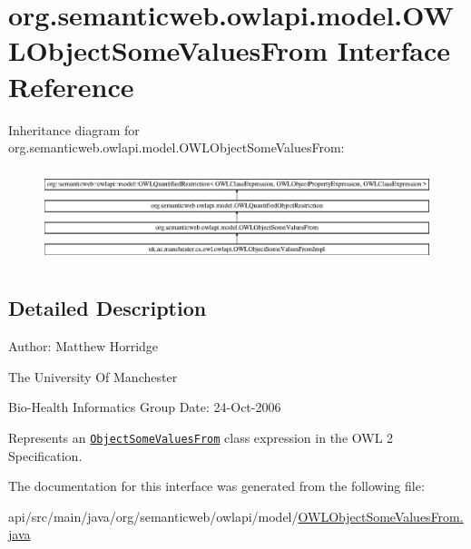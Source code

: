 \hypertarget{interfaceorg_1_1semanticweb_1_1owlapi_1_1model_1_1_o_w_l_object_some_values_from}{\section{org.\-semanticweb.\-owlapi.\-model.\-O\-W\-L\-Object\-Some\-Values\-From Interface Reference}
\label{interfaceorg_1_1semanticweb_1_1owlapi_1_1model_1_1_o_w_l_object_some_values_from}
}
Inheritance diagram for org.\-semanticweb.\-owlapi.\-model.\-O\-W\-L\-Object\-Some\-Values\-From\-:\begin{figure}[H]
\begin{center}
\leavevmode
\includegraphics[height=2.768850cm]{interfaceorg_1_1semanticweb_1_1owlapi_1_1model_1_1_o_w_l_object_some_values_from}
\end{center}
\end{figure}


\subsection{Detailed Description}
Author\-: Matthew Horridge\par
 The University Of Manchester\par
 Bio-\/\-Health Informatics Group Date\-: 24-\/\-Oct-\/2006 

Represents an \href{http://www.w3.org/TR/2009/REC-owl2-syntax-20091027/#Existential_Quantification}{\tt Object\-Some\-Values\-From} class expression in the O\-W\-L 2 Specification. 

The documentation for this interface was generated from the following file\-:\begin{DoxyCompactItemize}
\item 
api/src/main/java/org/semanticweb/owlapi/model/\hyperlink{_o_w_l_object_some_values_from_8java}{O\-W\-L\-Object\-Some\-Values\-From.\-java}\end{DoxyCompactItemize}
